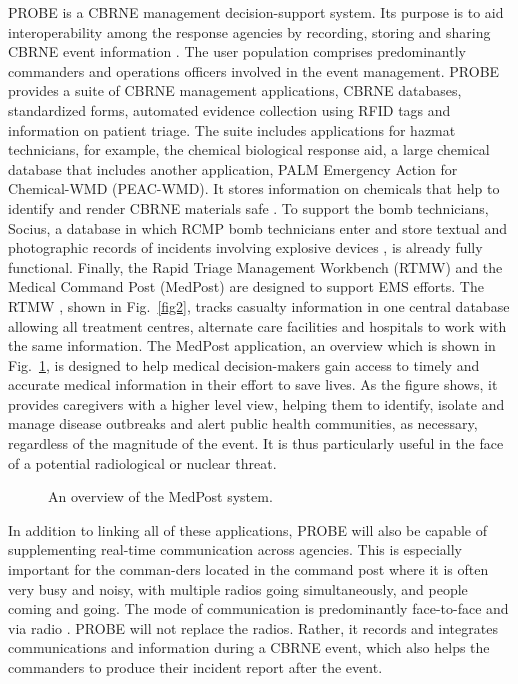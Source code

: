 \documentclass[link]{IWCOMP}
\begin{document}
PROBE is a CBRNE management decision-support system. Its purpose is to aid
interoperability among the response agencies by recording, storing and
sharing CBRNE event information \citep{bib1}. The user population comprises
predominantly commanders and operations officers involved in the event
management. PROBE provides a suite of CBRNE management applications, CBRNE
databases, standardized forms, automated evidence collection using RFID tags
and information on patient triage. The suite includes applications for
hazmat technicians, for example, the chemical biological response aid, a
large chemical database that includes another application, PALM Emergency
Action for Chemical-WMD (PEAC-WMD). It stores information on chemicals that
help to identify and render CBRNE materials safe \citep{bib1}. To support
the bomb technicians, Socius, a database in which RCMP bomb technicians
enter and store textual and photographic records of incidents involving
explosive devices \citep{bib1}, is already fully functional. Finally, the
Rapid Triage Management Workbench (RTMW) and the Medical Command Post
(MedPost) are designed to support EMS efforts. The RTMW \citep{bib26},
shown in Fig.~\ref{fig2}, tracks casualty information in one central database
allowing all treatment centres, alternate care facilities and hospitals to
work with the same information. The MedPost application, an overview which
is shown in Fig.~\ref{fig3}, is designed to help medical decision-makers gain access
to timely and accurate medical information in their effort to save lives. As
the figure shows, it provides caregivers with a higher level view, helping
them to identify, isolate and manage disease outbreaks and alert public
health communities, as necessary, regardless of the magnitude of the event.
It is thus particularly useful in the face of a potential radiological or
nuclear threat.

\begin{figure}[]
\centerline{}
\caption{An overview of the MedPost system.\label{fig3}}
\end{figure}

In addition to linking all of these applications, PROBE will also be capable
of supplementing real-time communication across agencies. This is especially
important for the comman-\break ders located in the command post where it is often
very busy and noisy, with multiple radios going simultaneously, and people
coming and going. The mode of communication is predominantly face-to-face
and via radio \citep{bib12}. PROBE will not replace the radios.
Rather, it records and integrates communications and information during a
CBRNE event, which also helps the commanders to produce their incident
report after the event.
\end{document}

